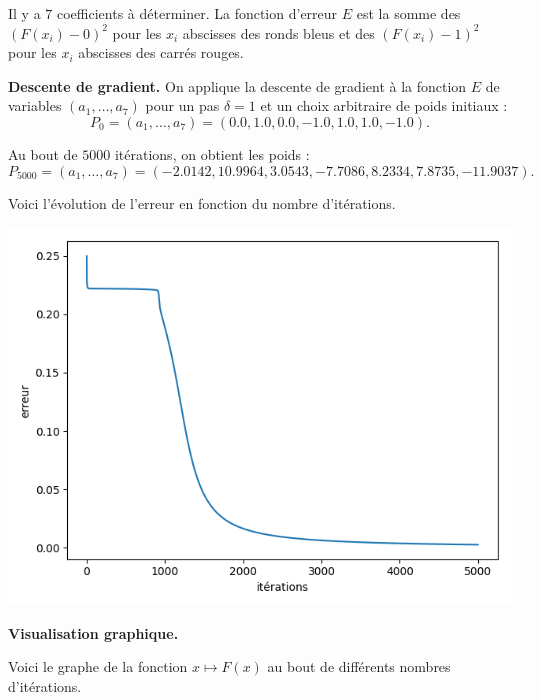 \documentclass[11pt,class=report,crop=false]{standalone}
\begin{document}

Il y a $7$ coefficients à déterminer.
La fonction d'erreur $E$ est la somme des $(F(x_i)-0)^2$ pour les $x_i$ abscisses des ronds bleus et des $(F(x_i)-1)^2$ pour les $x_i$ abscisses des carrés rouges.

\bigskip

\textbf{Descente de gradient.}
On applique la descente de gradient à la fonction $E$ de variables $(a_1,\ldots,a_7)$ pour un pas $\delta = 1$ et un choix arbitraire de poids initiaux :
$$P_0 = (a_1,\ldots,a_7) = (0.0, 1.0, 0.0, -1.0, 1.0, 1.0, -1.0).$$

Au bout de $5000$ itérations, on obtient les poids :
$$P_{5000} = (a_1,\ldots,a_7) = (-2.0142, 10.9964, 3.0543, -7.7086, 8.2334, 7.8735, -11.9037).$$


Voici l'évolution de l'erreur en fonction du nombre d'itérations.
 \begin{center}
 \includegraphics[scale=\myscale,scale=0.5]{figures/retro_03_f}
 \end{center}
 
 
\bigskip

\textbf{Visualisation graphique.}

Voici le graphe de la fonction $x \mapsto F(x)$ au bout de différents nombres d'itérations.
\end{document}
